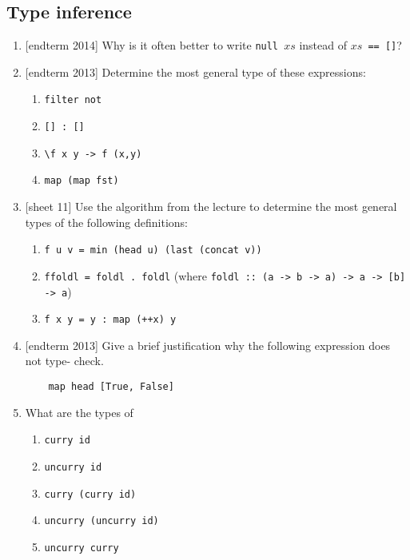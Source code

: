 \documentclass{article}
\def\code#1{\texttt{#1}}
\begin{document}
\subsection{Type inference}
\begin{enumerate}
    \item {[endterm 2014]} Why is it often better to write \code{null $xs$} instead of \code{$xs$ == []}?

    \item {[endterm 2013]} Determine the most general type of these expressions:
        \begin{enumerate}
            \item \code{filter not}
            \item \code{[] : []}
            \item \code{\textbackslash f x y -> f (x,y)}
            \item \code{map (map fst)}
        \end{enumerate}

    \item {[sheet 11]} Use the algorithm from the lecture to determine the most general types of the following definitions:
        \begin{enumerate}
            \item \code{f u v = min (head u) (last (concat v))}
            \item \code{ffoldl = foldl . foldl} (where \code{foldl :: (a -> b -> a) -> a -> [b] -> a})
            \item \code{f x y = y : map (++x) y}
        \end{enumerate}

    \item {[endterm 2013]} Give a brief justification why the following expression does not type- check.
        \begin{verbatim}
    map head [True, False]
        \end{verbatim}

    \item \cite[p. 319]{thompson} What are the types of
        \begin{enumerate}
            \item \code{curry id}
            \item \code{uncurry id}
            \item \code{curry (curry id)}
            \item \code{uncurry (uncurry id)}
            \item \code{uncurry curry}
        \end{enumerate}


\end{enumerate}
\end{document}
